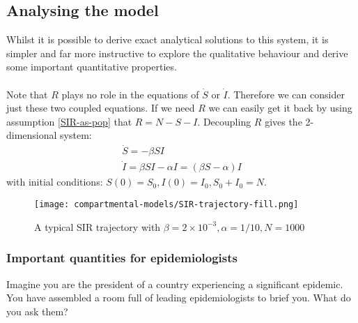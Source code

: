 \subsection{Analysing the model}
Whilst it is possible to derive exact analytical solutions to this system\cite{exact-SIR}, it is simpler and far more instructive to explore the qualitative behaviour and derive some important quantitative properties.\\
\\
Note that $R$ plays no role in the equations of $\dot S$ or $\dot I$. Therefore we can consider just these two coupled equations\cite{martcheva}. If we need $R$ we can easily get it back by using assumption \ref{SIR-as-pop} that $R=N-S-I$. Decoupling $R$ gives the 2-dimensional system:
\begin{eqnarray}
	\dot S=-\beta S I\label{red-SIR1}\\
	\dot I=\beta S I-\alpha I=(\beta S-\alpha)I\label{red-SIR2}
\end{eqnarray}
with initial conditions: $S(0)=S_0,I(0)=I_0, S_0+I_0=N$.
\begin{figure}
	\centering
	\texttt{[image: compartmental-models/SIR-trajectory-fill.png]}
	\caption{A typical SIR trajectory with $\beta=2\times10^{-3},\alpha=1/10, N=1000$}
\end{figure}
\subsubsection{Important quantities for epidemiologists}
Imagine you are the president of a country experiencing a significant epidemic. You have assembled a room full of leading epidemiologists to brief you. What do you ask them?

